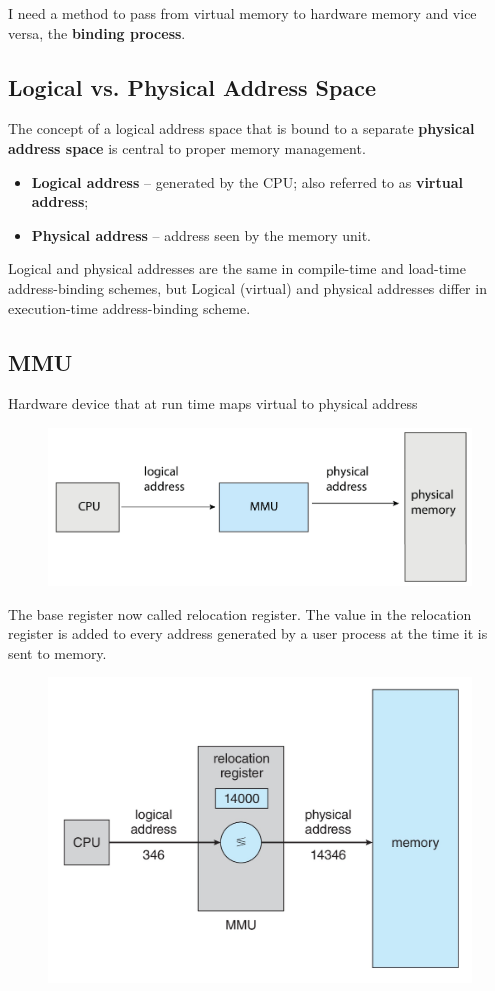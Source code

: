 I need a method to pass from virtual memory to hardware memory and vice versa, the \textbf{binding process}.

\subsection{Logical vs. Physical Address Space}
The concept of a logical address space that is bound to a separate \textbf{physical address space} is central to proper memory management.

\begin{itemize}
    \item \textbf{Logical address} – generated by the CPU; also referred to as \textbf{virtual address};
    \item \textbf{Physical address} – address seen by the memory unit.
\end{itemize}

Logical and physical addresses are the same in compile-time and
load-time address-binding schemes, but Logical (virtual) and physical addresses differ in execution-time
address-binding scheme.


\subsection{MMU}
Hardware device that at run time maps virtual to physical address

\begin{figure}[htbp]
    \centering
    \includegraphics[width=0.65\linewidth]{img/hnter.png}
\end{figure}

The base register now called relocation register. The value in the relocation register is added to every address
generated by a user process at the time it is sent to memory.

\begin{figure}[htbp]
    \centering
    \includegraphics[width=0.6\linewidth]{img/mmuu.png}
\end{figure}

